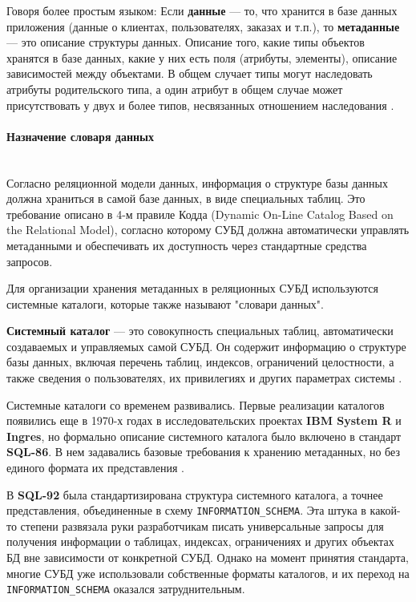 Говоря более простым языком: 
Если \textbf{данные} — то, что хранится в базе данных приложения (данные о клиентах, пользователях, заказах и т.п.), то \textbf{метаданные} — это описание структуры данных. Описание того, какие типы объектов хранятся в базе данных, какие у них есть поля (атрибуты, элементы), описание зависимостей между объектами. В общем случает типы могут наследовать атрибуты родительского типа, а один атрибут в общем случае может присутствовать у двух и более типов, несвязанных отношением наследования \autocite{Metadatahabr}.

\paragraph{Назначение словаря данных} ~\\

Согласно реляционной модели данных, информация о структуре базы данных должна храниться в самой базе данных, в виде специальных таблиц. Это требование описано в 4-м правиле Кодда (Dynamic On-Line Catalog Based on the Relational Model), согласно которому СУБД должна автоматически управлять метаданными и обеспечивать их доступность через стандартные средства запросов.

Для организации хранения метаданных в реляционных СУБД используются системные каталоги, которые также называют "словари данных".

\begin{grayquote}
    \textbf{Системный каталог} — это совокупность специальных таблиц, автоматически создаваемых и управляемых самой СУБД. Он содержит информацию о структуре базы данных, включая перечень таблиц, индексов, ограничений целостности, а также сведения о пользователях, их привилегиях и других параметрах системы \autocite{IntuitLec14}.
\end{grayquote}

Системные каталоги со временем развивались. Первые реализации каталогов появились еще в 1970-х годах в исследовательских проектах \textbf{IBM System R} и \textbf{Ingres}, но формально описание системного каталога было включено в стандарт \textbf{SQL-86}. В нем задавались базовые требования к хранению метаданных, но без единого формата их представления \autocite{DictHist}.

В \textbf{SQL-92} была стандартизирована структура системного каталога, а точнее представления, объединенные в схему \texttt{INFORMATION\_SCHEMA}. Эта штука в какой-то степени развязала руки разработчикам писать универсальные запросы для получения информации о таблицах, индексах, ограничениях и других объектах БД вне зависимости от конкретной СУБД. Однако на момент принятия стандарта, многие СУБД уже использовали собственные форматы каталогов, и их переход на \texttt{INFORMATION\_SCHEMA} оказался затруднительным.

